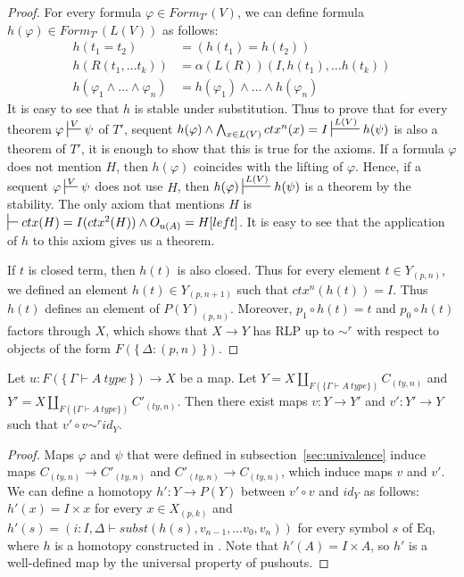 \documentclass[reqno]{amsart}
\theoremstyle{definition}
\theoremstyle{remark}
\newcommand{\Eq}{\mathrm{Eq}}
\numberwithin{figure}{section}
\begin{document}
\begin{proof}
For every formula $\varphi \in Form_{T'}(V)$, we can define formula $h(\varphi) \in Form_{T'}(L(V))$ as follows:
\begin{align*}
h(t_1 = t_2) & = (h(t_1) = h(t_2)) \\
h(R(t_1, \ldots t_k)) & = \alpha(L(R))(I, h(t_1), \ldots h(t_k)) \\
h(\varphi_1 \land \ldots \land \varphi_n) & = h(\varphi_1) \land \ldots \land h(\varphi_n)
\end{align*}
It is easy to see that $h$ is stable under substitution.
Thus to prove that for every theorem $\varphi \sststile{}{V} \psi$ of $T'$, sequent $h(\varphi) \land \bigwedge_{x \in L(V)} ctx^n(x) = I \sststile{}{L(V)} h(\psi)$
is also a theorem of $T'$, it is enough to show that this is true for the axioms.
If a formula $\varphi$ does not mention $H$, then $h(\varphi)$ coincides with the lifting of $\varphi$.
Hence, if a sequent $\varphi \sststile{}{V} \psi$ does not use $H$, then $h(\varphi) \sststile{}{L(V)} h(\psi)$ is a theorem by the stability.
The only axiom that mentions $H$ is $\sststile{}{} ctx(H) = I(ctx^2(H)) \land O_{u(A)} = H[left]$.
It is easy to see that the application of $h$ to this axiom gives us a theorem.

If $t$ is closed term, then $h(t)$ is also closed.
Thus for every element $t \in Y_{(p,n)}$, we defined an element $h(t) \in Y_{(p,n+1)}$ such that $ctx^n(h(t)) = I$.
Thus $h(t)$ defines an element of $P(Y)_{(p,n)}$.
Moreover, $p_1 \circ h(t) = t$ and $p_0 \circ h(t)$ factors through $X$,
which shows that $X \to Y$ has RLP up to $\sim^r$ with respect to objects of the form $F(\{\,\Delta : (p,n)\,\})$.
\end{proof}

\begin{lem}[Jhom]
Let $u : F(\{\,\Gamma \vdash A\ type\,\}) \to X$ be a map.
Let $Y = X \amalg_{F(\{ \Gamma \vdash A\ type \})} C_{(ty,n)}$ and $Y' = X \amalg_{F(\{ \Gamma \vdash A\ type \})} C'_{(ty,n)}$.
Then there exist maps $v : Y \to Y'$ and $v' : Y' \to Y$ such that $v' \circ v \sim^r id_Y$.
\end{lem}
\begin{proof}
Maps $\varphi$ and $\psi$ that were defined in subsection~\ref{sec:univalence} induce maps $C_{(ty,n)} \to C'_{(ty,n)}$ and $C'_{(ty,n)} \to C_{(ty,n)}$, which induce maps $v$ and $v'$.
We can define a homotopy $h' : Y \to P(Y)$ between $v' \circ v$ and $id_Y$ as follows: $h'(x) = I \times x$ for every $x \in X_{(p,k)}$
and $h'(s) = (i : I, \Delta \vdash subst(h(s), v_{n-1}, \ldots v_0, v_n))$ for every symbol $s$ of $\Eq$,
where $h$ is a homotopy constructed in .
Note that $h'(A) = I \times A$, so $h'$ is a well-defined map by the universal property of pushouts.
\end{proof}
\end{document}

